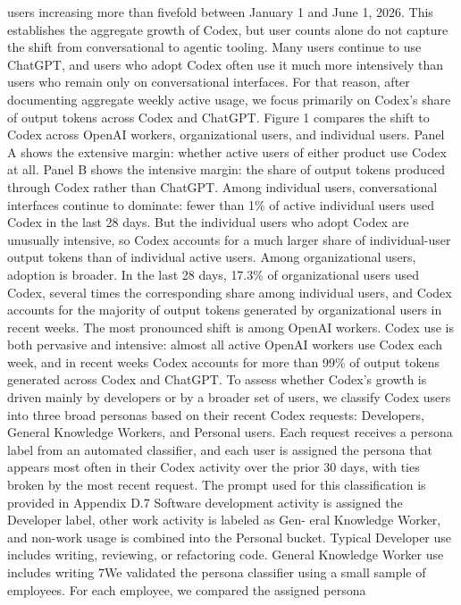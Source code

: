users increasing more than fivefold between January 1 and June 1, 2026. This establishes the aggregate
growth of Codex, but user counts alone do not capture the shift from conversational to agentic tooling.
Many users continue to use ChatGPT, and users who adopt Codex often use it much more intensively
than users who remain only on conversational interfaces. For that reason, after documenting aggregate
weekly active usage, we focus primarily on Codex’s share of output tokens across Codex and ChatGPT.
Figure 1 compares the shift to Codex across OpenAI workers, organizational users, and individual
users. Panel A shows the extensive margin: whether active users of either product use Codex at all.
Panel B shows the intensive margin: the share of output tokens produced through Codex rather than
ChatGPT. Among individual users, conversational interfaces continue to dominate: fewer than 1\% of
active individual users used Codex in the last 28 days. But the individual users who adopt Codex are
unusually intensive, so Codex accounts for a much larger share of individual-user output tokens than
of individual active users. Among organizational users, adoption is broader. In the last 28 days, 17.3\%
of organizational users used Codex, several times the corresponding share among individual users, and
Codex accounts for the majority of output tokens generated by organizational users in recent weeks. The
most pronounced shift is among OpenAI workers. Codex use is both pervasive and intensive: almost all
active OpenAI workers use Codex each week, and in recent weeks Codex accounts for more than 99\%
of output tokens generated across Codex and ChatGPT.
To assess whether Codex’s growth is driven mainly by developers or by a broader set of users,
we classify Codex users into three broad personas based on their recent Codex requests: Developers,
General Knowledge Workers, and Personal users. Each request receives a persona label from an automated
classifier, and each user is assigned the persona that appears most often in their Codex activity over
the prior 30 days, with ties broken by the most recent request. The prompt used for this classification is
provided in Appendix D.7
Software development activity is assigned the Developer label, other work activity is labeled as Gen-
eral Knowledge Worker, and non-work usage is combined into the Personal bucket. Typical Developer
use includes writing, reviewing, or refactoring code. General Knowledge Worker use includes writing
7We validated the persona classifier using a small sample of employees. For each employee, we compared the assigned persona
